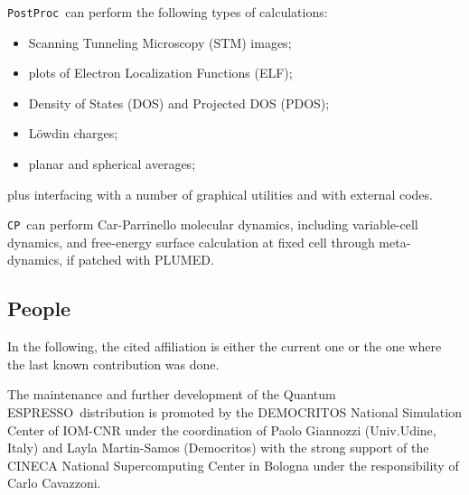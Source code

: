 \documentclass[12pt,a4paper]{article}
\def\qe{{\sc Quantum ESPRESSO}}
\def\CP{\texttt{CP}}
\def\PostProc{\texttt{PostProc}}
\begin{document}
\PostProc\ can perform the following types of calculations:
\begin{itemize}
  \item Scanning Tunneling Microscopy (STM) images;
  \item plots of Electron Localization Functions (ELF);
  \item Density of States (DOS) and Projected DOS (PDOS);
  \item L\"owdin charges;
  \item planar and spherical averages;
\end{itemize}
plus interfacing with a number of graphical utilities and with 
external codes.

\CP\ can perform Car-Parrinello molecular dynamics, including
variable-cell dynamics, and free-energy surface calculation at 
fixed cell through meta-dynamics, if patched with PLUMED.

\subsection{People}

In the following, the cited affiliation is either the current one 
or the one where the last known contribution was done.

The maintenance and further development of the \qe\ distribution
is promoted by the DEMOCRITOS National Simulation Center 
of IOM-CNR under the coordination of
Paolo Giannozzi (Univ.Udine, Italy) and Layla Martin-Samos 
(Democritos) with the strong support
of the CINECA National Supercomputing Center in Bologna under 
the responsibility of Carlo Cavazzoni.
\end{document}
